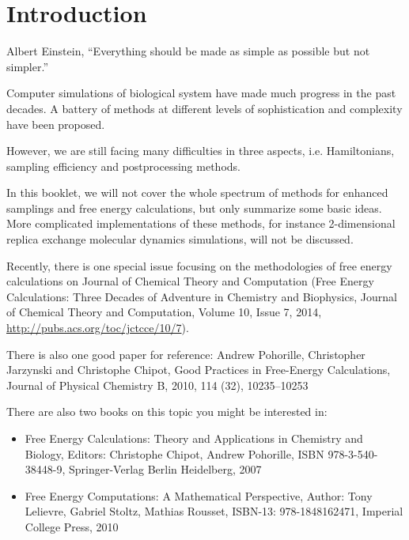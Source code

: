 \chapter{Introduction\label{chapter:introduction}}

\begin{chapquote}{Albert Einstein, %
	}
``Everything should be made as simple as possible but not simpler.''
\end{chapquote}

Computer simulations of biological system have made much progress in the past decades. A battery of methods at different levels of sophistication and complexity have been proposed.

However, we are still facing many difficulties in three aspects, i.e. Hamiltonians, sampling efficiency and postprocessing methods.\cite{NielsJCTC2014}

In this booklet, we will not cover the whole spectrum of methods for enhanced samplings and free energy calculations, but only summarize some basic ideas. 
More complicated implementations of these methods, for instance 2-dimensional replica exchange molecular dynamics simulations, will not be discussed.

Recently, there is one special issue focusing on the methodologies of free energy calculations on Journal of Chemical Theory and Computation (Free Energy Calculations: Three Decades of Adventure in Chemistry and Biophysics, Journal of Chemical Theory and Computation, Volume 10, Issue 7, 2014, \url{http://pubs.acs.org/toc/jctcce/10/7}). 

There is also one good paper for reference: Andrew Pohorille, Christopher Jarzynski and Christophe Chipot, Good Practices in Free-Energy Calculations, Journal of Physical Chemistry B, 2010, 114 (32), 10235–10253

There are also two books on this topic you might be interested in:
\begin{itemize}
\item Free Energy Calculations: Theory and Applications in Chemistry and Biology, Editors: Christophe Chipot, Andrew Pohorille, ISBN 978-3-540-38448-9, Springer-Verlag Berlin Heidelberg, 2007
\item Free Energy Computations: A Mathematical Perspective, Author: Tony Lelievre, Gabriel Stoltz, Mathias Rousset, ISBN-13: 978-1848162471, Imperial College Press, 2010
\end{itemize}

